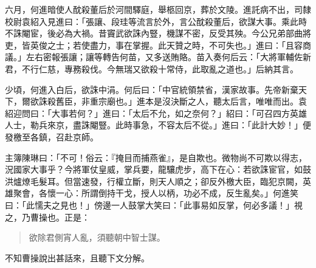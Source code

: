 六月，何進暗使人酖殺董后於河間驛庭，舉柩回京，葬於文陵。進託病不出，司隸校尉袁紹入見進曰：「張讓、段珪等流言於外，言公酖殺董后，欲謀大事。乘此時不誅閹宦，後必為大禍。昔竇武欲誅內豎，機謀不密，反受其殃。今公兄弟部曲將吏，皆英俊之士；若使盡力，事在掌握。此天贊之時，不可失也。」進曰：「且容商議。」左右密報張讓；讓等轉告何苗，又多送賄賂。苗入奏何后云：「大將軍輔佐新君，不行仁慈，專務殺伐。今無瑞又欲殺十常侍，此取亂之道也。」后納其言。

少頃，何進入白后，欲誅中涓。何后曰：「中官統領禁省，漢家故事。先帝新棄天下，爾欲誅殺舊臣，非重宗廟也。」進本是沒決斷之人，聽太后言，唯唯而出。袁紹迎問曰：「大事若何？」進曰：「太后不允，如之奈何？」紹曰：「可召四方英雄人士，勒兵來京，盡誅閹豎。此時事急，不容太后不從。」進曰：「此計大妙！」便發檄至各鎮，召赴京師。

主簿陳琳曰：「不可！俗云：『掩目而捕燕雀』，是自欺也。微物尚不可欺以得志，況國家大事乎？今將軍仗皇威，掌兵要，龍驤虎步，高下在心：若欲誅宦官，如鼓洪爐燎毛髮耳。但當速發，行權立斷，則天人順之；卻反外檄大臣，臨犯京闕，英雄聚會，各懷一心：所謂倒持干戈，授人以柄，功必不成，反生亂矣。」何進笑曰：「此懦夫之見也！」傍邊一人鼓掌大笑曰：「此事易如反掌，何必多議！」視之，乃曹操也。正是：

\begin{quote}
欲除君側宵人亂，須聽朝中智士謀。
\end{quote}

不知曹操說出甚話來，且聽下文分解。
